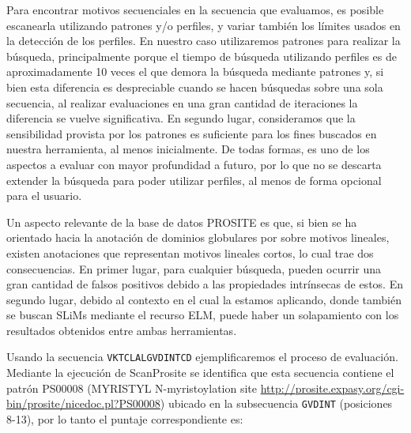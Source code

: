 Para encontrar motivos secuenciales en la secuencia que evaluamos, es posible escanearla utilizando patrones y/o perfiles, y variar también los límites usados en la detección de los perfiles. 
En nuestro caso utilizaremos patrones para realizar la búsqueda, principalmente porque el tiempo de búsqueda utilizando perfiles es de aproximadamente 10 veces el que demora la búsqueda mediante patrones 
y, si bien esta diferencia es despreciable cuando se hacen búsquedas sobre una sola secuencia, al realizar evaluaciones en una gran cantidad de iteraciones la diferencia se vuelve significativa.
En segundo lugar, consideramos que la sensibilidad provista por los patrones es suficiente para los fines buscados en nuestra herramienta, al menos inicialmente.
De todas formas, es uno de los aspectos a evaluar con mayor profundidad a futuro, por lo que no se descarta extender la búsqueda para poder utilizar perfiles, al menos de forma opcional para el usuario. 

Un aspecto relevante de la base de datos PROSITE es que, si bien se ha orientado hacia la anotación de dominios globulares por sobre motivos lineales, existen anotaciones que representan motivos lineales cortos, 
lo cual trae dos consecuencias. En primer lugar, para cualquier búsqueda, pueden ocurrir una gran cantidad de falsos positivos debido a las propiedades intrínsecas de estos.
En segundo lugar, debido al contexto en el cual la estamos aplicando, donde también se buscan SLiMs mediante el recurso ELM, puede haber un solapamiento con los resultados obtenidos entre ambas herramientas.

Usando la secuencia \texttt{VKTCLALGVDINTCD} ejemplificaremos el proceso de evaluación.
Mediante la ejecución de ScanProsite se identifica que esta secuencia contiene el patrón PS00008 (MYRISTYL N-myristoylation site 
\url{http://prosite.expasy.org/cgi-bin/prosite/nicedoc.pl?PS00008}) ubicado en la subsecuencia \texttt{GVDINT} (posiciones 8-13), por lo tanto el puntaje correspondiente es:

